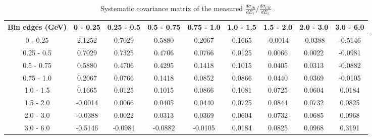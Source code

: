 \documentclass[aps,prl,twocolumn,superscriptaddress,nofootinbib]{revtex4-1}
\begin{document}
\begin{table}[h!]
  \centering
  \caption{Systematic covariance matrix of the measured $\frac{d\sigma_{Pb}}{dE_{\pi}}/\frac{d\sigma_{CH}}{dE_{\pi}}$}
    \begin{tabular}{c||cccccccc}
      Bin edges (GeV) & 0 - 0.25 & 0.25 - 0.5 & 0.5 - 0.75 & 0.75 - 1.0 & 1.0 - 1.5 & 1.5 - 2.0 & 2.0 - 3.0 & 3.0 - 6.0 \\
\hline \hline
        0 - 0.25 &  2.1252 &  0.7029 &  0.5880 &  0.2067 &  0.1665 & -0.0014 & -0.0388 & -0.5146 \\
      0.25 - 0.5 &  0.7029 &  0.7325 &  0.4706 &  0.0766 &  0.0125 &  0.0066 &  0.0022 & -0.0981 \\
      0.5 - 0.75 &  0.5880 &  0.4706 &  0.4295 &  0.1418 &  0.1015 &  0.0405 &  0.0313 & -0.0882 \\
      0.75 - 1.0 &  0.2067 &  0.0766 &  0.1418 &  0.0852 &  0.0866 &  0.0440 &  0.0369 & -0.0105 \\
       1.0 - 1.5 &  0.1665 &  0.0125 &  0.1015 &  0.0866 &  0.1081 &  0.0725 &  0.0604 &  0.0184 \\
       1.5 - 2.0 & -0.0014 &  0.0066 &  0.0405 &  0.0440 &  0.0725 &  0.0844 &  0.0732 &  0.0825 \\
       2.0 - 3.0 & -0.0388 &  0.0022 &  0.0313 &  0.0369 &  0.0604 &  0.0732 &  0.0685 &  0.0968 \\
       3.0 - 6.0 & -0.5146 & -0.0981 & -0.0882 & -0.0105 &  0.0184 &  0.0825 &  0.0968 &  0.3191 \\
    \end{tabular}
  \label{tablecov:Pb_Systematic_Epi}
\end{table}
\end{document}
